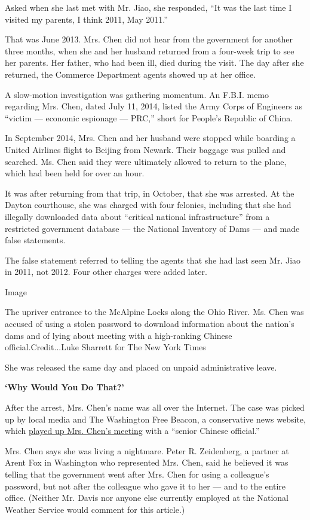 Asked when she last met with Mr. Jiao, she responded, ``It was the last
time I visited my parents, I think 2011, May 2011.''

That was June 2013. Mrs. Chen did not hear from the government for
another three months, when she and her husband returned from a four-week
trip to see her parents. Her father, who had been ill, died during the
visit. The day after she returned, the Commerce Department agents showed
up at her office.

A slow-motion investigation was gathering momentum. An F.B.I. memo
regarding Mrs. Chen, dated July 11, 2014, listed the Army Corps of
Engineers as ``victim --- economic espionage --- PRC,'' short for
People's Republic of China.

In September 2014, Mrs. Chen and her husband were stopped while boarding
a United Airlines flight to Beijing from Newark. Their baggage was
pulled and searched. Ms. Chen said they were ultimately allowed to
return to the plane, which had been held for over an hour.

It was after returning from that trip, in October, that she was
arrested. At the Dayton courthouse, she was charged with four felonies,
including that she had illegally downloaded data about ``critical
national infrastructure'' from a restricted government database --- the
National Inventory of Dams --- and made false statements.

The false statement referred to telling the agents that she had last
seen Mr. Jiao in 2011, not 2012. Four other charges were added later.

Image

The upriver entrance to the McAlpine Locks along the Ohio River. Ms.
Chen was accused of using a stolen password to download information
about the nation's dams and of lying about meeting with a high-ranking
Chinese official.Credit...Luke Sharrett for The New York Times

She was released the same day and placed on unpaid administrative leave.

\textbf{`Why Would You Do That?'}

After the arrest, Mrs. Chen's name was all over the Internet. The case
was picked up by local media and The Washington Free Beacon, a
conservative news website, which
\href{http://freebeacon.com/national-security/noaa-employee-charged-with-computer-breach-met-senior-chinese-official-in-beijing/}{played
up Mrs. Chen's meeting} with a ``senior Chinese official.''

Mrs. Chen says she was living a nightmare. Peter R. Zeidenberg, a
partner at Arent Fox in Washington who represented Mrs. Chen, said he
believed it was telling that the government went after Mrs. Chen for
using a colleague's password, but not after the colleague who gave it to
her --- and to the entire office. (Neither Mr. Davis nor anyone else
currently employed at the National Weather Service would comment for
this article.)

